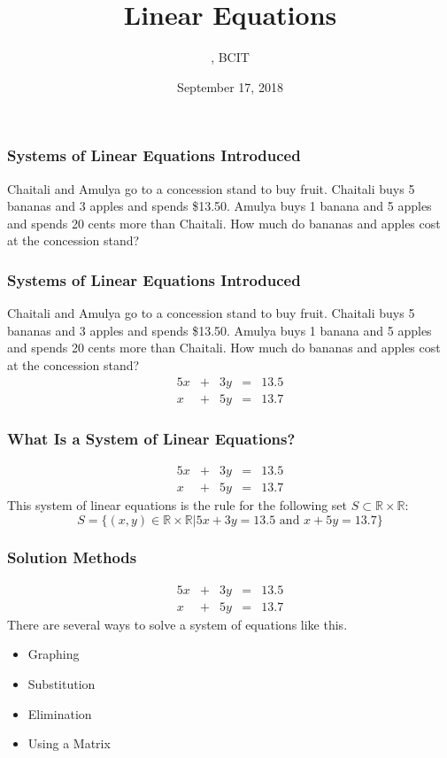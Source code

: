 \documentclass[xcolor=dvipsnames]{beamer}
\title{Linear Equations}
\subtitle{{\CourseNumber}, BCIT}
\author{\CourseName}
\date{September 17, 2018}
\begin{document}
\begin{frame}
  \titlepage
\end{frame}

\begin{frame}
  \frametitle{Systems of Linear Equations Introduced}
  Chaitali and Amulya go to a concession stand to buy fruit. Chaitali
  buys 5 bananas and 3 apples and spends \$13.50. Amulya buys 1 banana
  and 5 apples and spends 20 cents more than Chaitali. How much do
  bananas and apples cost at the concession stand?
\end{frame}

\begin{frame}
  \frametitle{Systems of Linear Equations Introduced}
  Chaitali and Amulya go to a concession stand to buy fruit. Chaitali
  buys 5 bananas and 3 apples and spends \$13.50. Amulya buys 1 banana
  and 5 apples and spends 20 cents more than Chaitali. How much do
  bananas and apples cost at the concession stand?
  \begin{equation}
    \label{eq:mohloogh}
    \begin{array}{rcrcl}
      5x&+&3y&=&13.5 \\
      x&+&5y&=&13.7
    \end{array}
  \end{equation}
\end{frame}

\begin{frame}
  \frametitle{What Is a System of Linear Equations?}
  \begin{equation}
    \label{eq:xaigeeke}
    \begin{array}{rcrcl}
      5x&+&3y&=&13.5 \\
      x&+&5y&=&13.7
    \end{array}
  \end{equation}
  This system of linear equations is the rule for the following set $S\subset\mathbb{R}\times\mathbb{R}$:
  \begin{equation}
    \label{eq:ahshohwa}
S=\{(x,y)\in\mathbb{R}\times\mathbb{R}|5x+3y=13.5\mbox{ and }x+5y=13.7\}
  \end{equation}
\end{frame}

\begin{frame}
  \frametitle{Solution Methods}
  \begin{equation}
    \label{eq:yeghahpi}
    \begin{array}{rcrcl}
      5x&+&3y&=&13.5 \\
      x&+&5y&=&13.7
    \end{array}
  \end{equation}
There are several ways to solve a system of equations like this. 
\begin{itemize}
\item Graphing
\item Substitution
\item Elimination
\item Using a Matrix
\end{itemize}
\end{frame}
\end{document}
